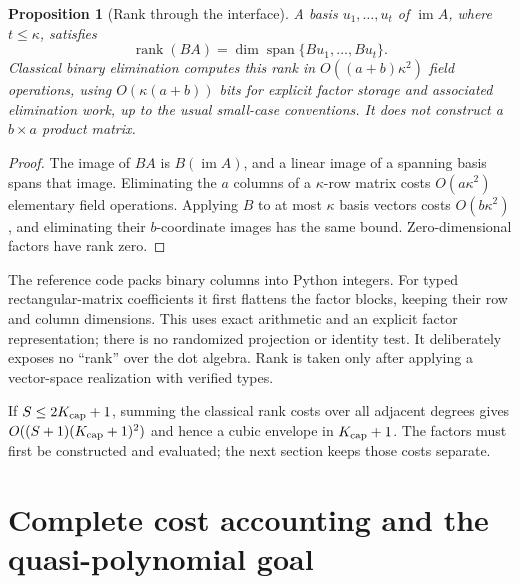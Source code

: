 \documentclass[11pt,letterpaper]{article}
\newtheorem{proposition}[theorem]{Proposition}
\theoremstyle{definition}\newtheorem{definition}[theorem]{Definition}
\theoremstyle{remark}\newtheorem{remark}[theorem]{Remark}
\newcommand{\rk}{\operatorname{rank}}
\newcommand{\im}{\operatorname{im}}
\begin{document}
\begin{proposition}[Rank through the interface]\label{prop:rankfactors}
A basis $u_1,\ldots,u_t$ of $\im A$, where $t\leq\kappa$, satisfies
\[
\rk(BA)=\dim\operatorname{span}\{Bu_1,\ldots,Bu_t\}.
\]
Classical binary elimination computes this rank in
$O((a+b)\kappa^2)$ field operations, using
$O(\kappa(a+b))$ bits for explicit factor storage and associated elimination
work, up to the usual small-case conventions. It does not construct a
$b\times a$ product matrix.
\end{proposition}
\begin{proof}
The image of $BA$ is $B(\im A)$, and a linear image of a spanning basis spans
that image. Eliminating the $a$ columns of a $\kappa$-row matrix costs
$O(a\kappa^2)$ elementary field operations. Applying $B$ to at most $\kappa$
basis vectors costs $O(b\kappa^2)$, and eliminating their $b$-coordinate
images has the same bound. Zero-dimensional factors have rank zero.
\end{proof}

The reference code packs binary columns into Python integers. For typed
rectangular-matrix coefficients it first flattens the factor blocks, keeping
their row and column dimensions. This uses exact arithmetic and an explicit
factor representation; there is no randomized projection or identity test.
It deliberately exposes no ``rank'' over the dot algebra. Rank is taken
only after applying a vector-space realization with verified types.

If $S\leq2K_{\rm cap}+1$, summing the classical rank costs over all
adjacent degrees gives $O((S+1)(K_{\rm cap}+1)^2)$ and hence a cubic envelope
in $K_{\rm cap}+1$. The factors must first be constructed and evaluated;
the next section keeps those costs separate.

\section{Complete cost accounting and the quasi-polynomial goal}
\end{document}
